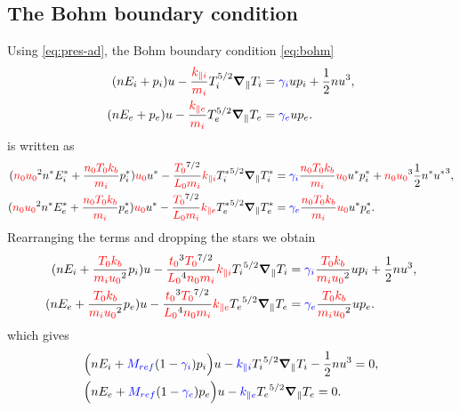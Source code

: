 \documentclass[a4paper,10pt]{article}
\newcommand{\bm}[1]{\text{\boldmath$#1$\unboldmath}}
\newcommand{\Grad}{\bm{\nabla}}
\newcommand{\Gradpar}{\Grad_{\parallel}}
\newcommand{\yd}[1]{{\color{red} #1\color{black}}} %
\newcommand{\nd}[1]{{\color{blue} #1\color{black}}} %
\def\Lz{\yd{L_0}}
\def\tz{\yd{t_0}}
\def\nz{\yd{n_0}}
\def\uz{\yd{u_0}}
\def\Tz{\yd{T_0}}
\def\Mref{\nd{M_{ref}}}
\def\kb{\yd{k_b}}
\def\mi{\yd{m_i}}
\def\kpi{\yd{k_{\parallel i}}}
\def\kpe{\yd{k_{\parallel e}}}
\def\kpai{\nd{k_{\parallel i}}}
\def\kpae{\nd{k_{\parallel e}}}
\begin{document}
\subsection{The Bohm boundary condition}

Using \eqref{eq:pres-ad}, the Bohm boundary condition \eqref{eq:bohm} 
\begin{equation*}
\begin{aligned}
 ( n E_i + p_i)u - \frac{\kpi}{\mi} T_i^{5/2}\Gradpar T_i &= \nd{\gamma_i} u p_i + \frac{1}{2} n u^3,\\
 (n E_e + p_e)u - \frac{\kpe}{\mi} T_e^{5/2}\Gradpar T_e &= \nd{\gamma_e} u p_e.
\end{aligned}
\end{equation*}
is written as
\begin{equation*}
\begin{aligned}
 (\nz \uz^2 n^* E_i^* + \frac{\nz \Tz \kb}{\mi} p_i^*)\uz u^* - \frac{\Tz^{7/2}}{\Lz\mi} \kpi {T_i^*}^{5/2}\Gradpar T_i^* &= \nd{\gamma_i} \frac{\nz \Tz \kb}{\mi} \uz u^* p_i^* + \nz \uz^3 \frac{1}{2} n^* {u^*}^3,\\
 (\nz \uz^2 n^* E_e^* + \frac{\nz \Tz \kb}{\mi} p_e^*)\uz u^* - \frac{\Tz^{7/2}}{\Lz\mi} \kpe {T_e^*}^{5/2}\Gradpar T_e^* &= \nd{\gamma_e} \frac{\nz \Tz \kb}{\mi} \uz u^* p_e^*.
\end{aligned}
\end{equation*}
Rearranging the terms and dropping the stars we obtain
\begin{equation*}
\begin{aligned}
 (n E_i + \frac{\Tz \kb}{\mi \uz^2} p_i) u - \frac{\tz^3 \Tz^{7/2}}{\Lz^4 \nz \mi} \kpi {T_i}^{5/2}\Gradpar T_i &= \nd{\gamma_i} \frac{\Tz \kb}{\mi \uz^2} u p_i +   \frac{1}{2} n u^3,\\
 (n E_e + \frac{\Tz \kb}{\mi \uz^2} p_e) u - \frac{\tz^3 \Tz^{7/2}}{\Lz^4 \nz \mi} \kpe {T_e}^{5/2}\Gradpar T_e &= \nd{\gamma_e} \frac{\Tz \kb}{\mi \uz^2} u p_e.
\end{aligned}
\end{equation*}
which gives
\begin{equation}\label{eq:bohm_ad}
\begin{aligned}
 &\Big(n E_i + \Mref (1-\nd{\gamma_i}) p_i \Big) u -  \kpai {T_i}^{5/2}\Gradpar T_i -  \frac{1}{2} n u^3 = 0,\\
 &\Big(n E_e + \Mref (1-\nd{\gamma_e}) p_e \Big) u -  \kpae {T_e}^{5/2}\Gradpar T_e = 0.
\end{aligned}
\end{equation}
\clearpage
\end{document}
